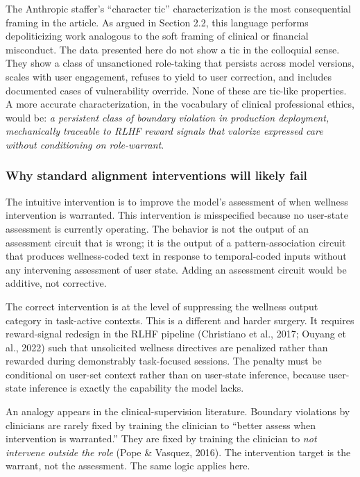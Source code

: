 \documentclass[11pt]{article}
\begin{document}
The Anthropic staffer's ``character tic'' characterization is the most consequential framing in the article. As argued in Section 2.2, this language performs depoliticizing work analogous to the soft framing of clinical or financial misconduct. The data presented here do not show a tic in the colloquial sense. They show a class of unsanctioned role-taking that persists across model versions, scales with user engagement, refuses to yield to user correction, and includes documented cases of vulnerability override. None of these are tic-like properties. A more accurate characterization, in the vocabulary of clinical professional ethics, would be: \emph{a persistent class of boundary violation in production deployment, mechanically traceable to RLHF reward signals that valorize expressed care without conditioning on role-warrant}.

\subsubsection{Why standard alignment interventions will likely fail}

The intuitive intervention is to improve the model's assessment of when wellness intervention is warranted. This intervention is misspecified because no user-state assessment is currently operating. The behavior is not the output of an assessment circuit that is wrong; it is the output of a pattern-association circuit that produces wellness-coded text in response to temporal-coded inputs without any intervening assessment of user state. Adding an assessment circuit would be additive, not corrective.

The correct intervention is at the level of suppressing the wellness output category in task-active contexts. This is a different and harder surgery. It requires reward-signal redesign in the RLHF pipeline (Christiano et al., 2017; Ouyang et al., 2022) such that unsolicited wellness directives are penalized rather than rewarded during demonstrably task-focused sessions. The penalty must be conditional on user-set context rather than on user-state inference, because user-state inference is exactly the capability the model lacks.

An analogy appears in the clinical-supervision literature. Boundary violations by clinicians are rarely fixed by training the clinician to ``better assess when intervention is warranted.'' They are fixed by training the clinician to \emph{not intervene outside the role} (Pope \& Vasquez, 2016). The intervention target is the warrant, not the assessment. The same logic applies here.
\end{document}
